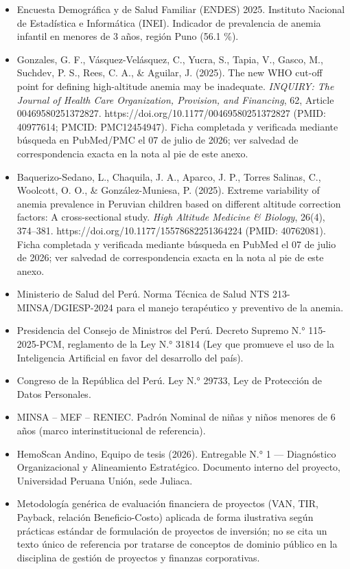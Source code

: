 \documentclass[11pt,a4paper]{article}
\providecommand{\tightlist}{%
  \setlength{\itemsep}{0pt}\setlength{\parskip}{0pt}}
\begin{document}
\begin{itemize}
\tightlist
\item
  Encuesta Demográfica y de Salud Familiar (ENDES) 2025. Instituto Nacional de Estadística e Informática (INEI). Indicador de prevalencia de anemia infantil en menores de 3 años, región Puno (56.1 \%).
\item
  Gonzales, G. F., Vásquez-Velásquez, C., Yucra, S., Tapia, V., Gasco, M., Suchdev, P. S., Rees, C. A., \& Aguilar, J. (2025). The new WHO cut-off point for defining high-altitude anemia may be inadequate. \emph{INQUIRY: The Journal of Health Care Organization, Provision, and Financing}, 62, Article 00469580251372827. https://doi.org/10.1177/00469580251372827 (PMID: 40977614; PMCID: PMC12454947). Ficha completada y verificada mediante búsqueda en PubMed/PMC el 07 de julio de 2026; ver salvedad de correspondencia exacta en la nota al pie de este anexo.
\item
  Baquerizo-Sedano, L., Chaquila, J. A., Aparco, J. P., Torres Salinas, C., Woolcott, O. O., \& González-Muniesa, P. (2025). Extreme variability of anemia prevalence in Peruvian children based on different altitude correction factors: A cross-sectional study. \emph{High Altitude Medicine \& Biology}, 26(4), 374--381. https://doi.org/10.1177/15578682251364224 (PMID: 40762081). Ficha completada y verificada mediante búsqueda en PubMed el 07 de julio de 2026; ver salvedad de correspondencia exacta en la nota al pie de este anexo.
\item
  Ministerio de Salud del Perú. Norma Técnica de Salud NTS 213-MINSA/DGIESP-2024 para el manejo terapéutico y preventivo de la anemia.
\item
  Presidencia del Consejo de Ministros del Perú. Decreto Supremo N.° 115-2025-PCM, reglamento de la Ley N.° 31814 (Ley que promueve el uso de la Inteligencia Artificial en favor del desarrollo del país).
\item
  Congreso de la República del Perú. Ley N.° 29733, Ley de Protección de Datos Personales.
\item
  MINSA -- MEF -- RENIEC. Padrón Nominal de niñas y niños menores de 6 años (marco interinstitucional de referencia).
\item
  HemoScan Andino, Equipo de tesis (2026). Entregable N.° 1 --- Diagnóstico Organizacional y Alineamiento Estratégico. Documento interno del proyecto, Universidad Peruana Unión, sede Juliaca.
\item
  Metodología genérica de evaluación financiera de proyectos (VAN, TIR, Payback, relación Beneficio-Costo) aplicada de forma ilustrativa según prácticas estándar de formulación de proyectos de inversión; no se cita un texto único de referencia por tratarse de conceptos de dominio público en la disciplina de gestión de proyectos y finanzas corporativas.
\end{itemize}
\end{document}
